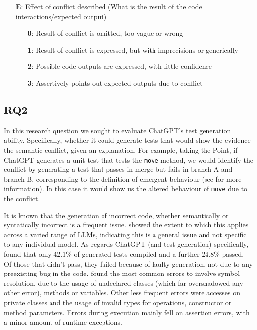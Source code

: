 \begin{itemize}
  \item[\textbf{E}:] Effect of conflict described (What is the result of the code interactions/expected output)
  \begin{itemize}
    \item[\textbf{0}:] Result of conflict is omitted, too vague or wrong
    \item[\textbf{1}:] Result of conflict is expressed, but with imprecisions or generically
    \item[\textbf{2}:] Possible code outputs are expressed, with little confidence
    \item[\textbf{3}:] Assertively points out expected outputs due to conflict
  \end{itemize}
\end{itemize}


\subsection{RQ2}

In this research question we sought to evaluate ChatGPT's test generation ability. Specifically, whether it could generate tests that would show the evidence the semantic conflict, given an explanation.
For example, taking the Point, if ChatGPT generates a unit test that tests the \texttt{move} method, we would identify the conflict by generating a test that passes in merge but fails in branch A and branch B, corresponding to the definition of emergent behaviour (see \citet{kn:nuno} for more information).
In this case it would show us the altered behaviour of \texttt{move} due to the conflict.

It is known that the generation of incorrect code, whether semantically or syntatically incorrect is a frequent issue.  showed the extent to which this applies across a varied range of LLMs, 
indicating this is a general issue and not specific to any individual model. As regards ChatGPT (and test generation) specifically,  found that only 42.1\% of generated tests compiled and a further
24.8\% passed. Of those that didn't pass, they failed because of faulty generation, not due to any preexisting bug in the code.
 found the most common errors to involve symbol resolution, due to the usage of undeclared classes (which far overshadowed any other error), methods or variables. Other less frequent errors were accesses on private classes and the usage
of invalid types for operations, constructor or method parameters.
Errors during execution mainly fell on assertion errors, with a minor amount of runtime exceptions.

